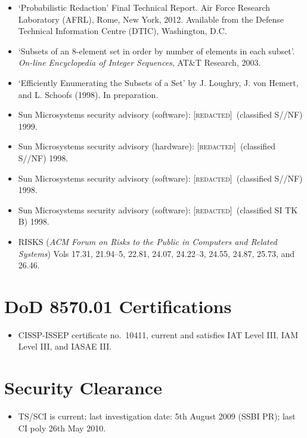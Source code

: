 \documentclass[letterpaper]{article}
\newcommand{\redacted}{\textsc{[redacted]}}
\begin{document}
\begin{itemize}
	\item `Probabilistic Redaction' Final Technical Report. Air Force Research
		Laboratory (AFRL), Rome, New York, 2012.  Available from the Defense Technical
		Information Centre (DTIC), Washington, D.C.

	\item `Subsets of an 8-element set in order by number of elements in each
		subset'. \emph{On-line Encyclopedia of Integer Sequences}, AT\&T Research, 2003.

	\item `Efficiently Enumerating the Subsets of a Set' by J. Loughry, J. von Hemert,
		and L. Schoofs (1998).  In preparation.

    \item Sun Microsystems security advisory (software): \redacted\ (classified S//NF) 1999.
	\item Sun Microsystems security advisory (hardware): \redacted\ (classified S//NF) 1998.
	\item Sun Microsystems security advisory (software): \redacted\ (classified S//NF) 1998.
	\item Sun Microsystems security advisory (software): \redacted\ (classified SI TK B) 1998.

    \item RISKS (\emph{ACM Forum on Risks to the Public in Computers
    and Related Systems}) Vols 17.31, 21.94--5, 22.81, 24.07,
    24.22--3, 24.55, 24.87, 25.73, and 26.46.

\end{itemize}

\section*{DoD 8570.01 Certifications}

\begin{itemize}
	\item CISSP-ISSEP certificate no.\ 10411, current and satisfies IAT Level III,
		IAM Level III, and IASAE III.
\end{itemize}

\section*{Security Clearance}

\begin{itemize}
	\item TS/SCI is current; last investigation date: 5th August 2009 (SSBI PR);
		last CI poly 26th May 2010.
\end{itemize}
\end{document}
